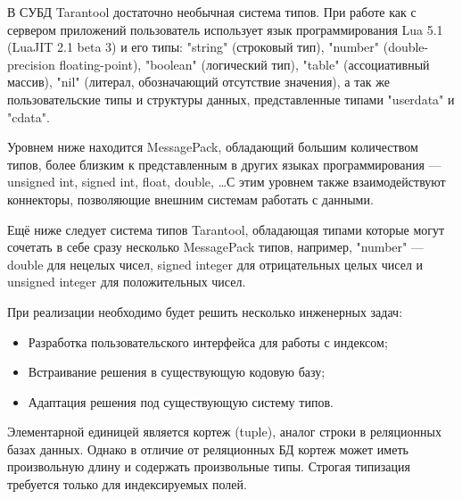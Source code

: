 В СУБД Tarantool достаточно необычная система типов.
При работе как с сервером приложений пользователь использует язык программирования
Lua 5.1 (LuaJIT 2.1 beta 3) и его типы: "string" (строковый тип),
"number" (double-precision floating-point),
"boolean" (логический тип),
"table" (ассоциативный массив),
"nil" (литерал, обозначающий отсутствие значения),
а так же пользовательские типы и структуры данных,
представленные типами "userdata" и "cdata".

Уровнем ниже находится MessagePack, обладающий большим количеством типов,
более близким к представленным в других языках программирования ---
unsigned int, signed int, float, double, \ldots С этим уровнем также взаимодействуют
коннекторы, позволяющие внешним системам работать с данными.

Ещё ниже следует система типов Tarantool, обладающая
типами которые могут сочетать в себе сразу несколько MessagePack типов, например,
"number" --- double для нецелых чисел, signed integer для отрицательных целых чисел
и unsigned integer для положительных чисел.

При реализации необходимо будет решить несколько инженерных задач:
\begin{itemize}
	\item Разработка пользовательского интерфейса для работы с индексом;
	\item Встраивание решения в существующую кодовую базу;
	\item Адаптация решения под существующую систему типов.
\end{itemize}

Элементарной единицей является кортеж (tuple), аналог строки в
реляционных базах данных. Однако в отличие от реляционных БД
кортеж может иметь произвольную длину и содержать произвольные типы.
Строгая типизация требуется только для индексируемых полей.
